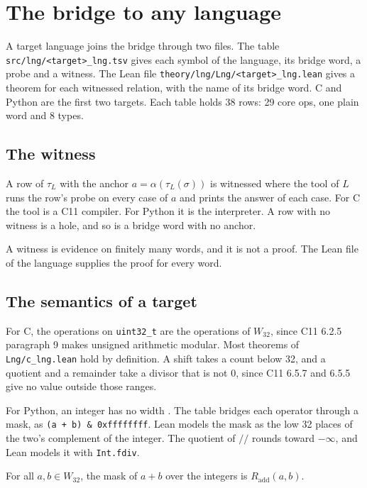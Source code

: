 \chapter{The bridge to any language}
\label{ch:targets}

A target language joins the bridge through two files. The table \texttt{src/lng/<target>\_lng.tsv} gives each
symbol of the language, its bridge word, a probe and a witness. The Lean file
\texttt{theory/lng/Lng/<target>\_lng.lean} gives a theorem for each witnessed relation, with the name of its bridge
word. C and Python are the first two targets. Each table holds 38 rows: 29 core ops, one plain word and 8 types.

\section{The witness}

\begin{definition}
A row of $\tau_L$ with the anchor $a = \alpha(\tau_L(\sigma))$ is witnessed where the tool of $L$ runs the row's
probe on every case of $a$ and prints the answer of each case. For C the tool is a C11 compiler. For Python it is
the interpreter. A row with no witness is a hole, and so is a bridge word with no anchor.
\end{definition}

A witness is evidence on finitely many words, and it is not a proof. The Lean file of the language supplies the
proof for every word.

\section{The semantics of a target}

For C, the operations on \texttt{uint32\_t} are the operations of $W_{32}$, since C11 6.2.5 paragraph 9 makes
unsigned arithmetic modular. Most theorems of \texttt{Lng/c\_lng.lean} hold by definition. A shift takes a count
below 32, and a quotient and a remainder take a divisor that is not 0, since C11 6.5.7 and 6.5.5 give no value
outside those ranges.

For Python, an integer has no width \cite{src:python}. The table bridges each operator through a mask, as
\texttt{(a + b) \& 0xffffffff}. Lean models the mask as the low 32 places of the two's complement of the integer.
The quotient of $/\!/$ rounds toward $-\infty$, and Lean models it with \texttt{Int.fdiv}.

\begin{theorem}
For all $a, b \in W_{32}$, the mask of $a + b$ over the integers is $R_{\mathrm{add}}(a, b)$.
\end{theorem}

